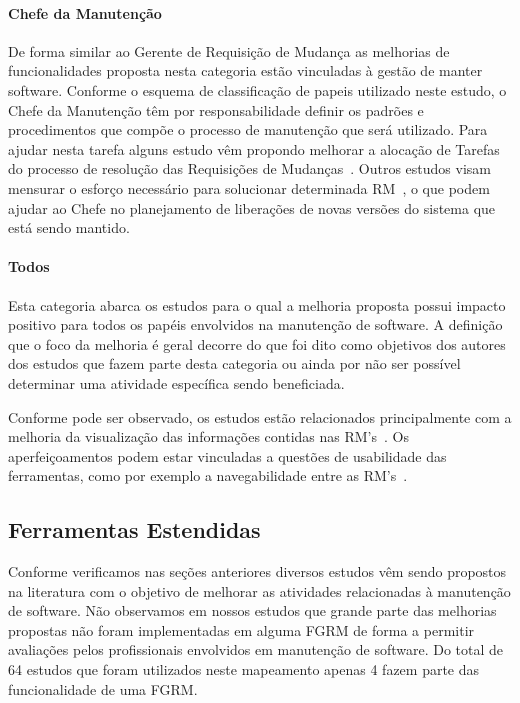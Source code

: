 \paragraph{Chefe da Manutenção} De forma similar ao Gerente de Requisição de
Mudança as melhorias de funcionalidades proposta nesta categoria estão
vinculadas à gestão de manter software. Conforme o esquema de  classificação de
papeis utilizado neste estudo, o Chefe da Manutenção têm por responsabilidade
definir os padrões e procedimentos que compõe o processo de manutenção que será
utilizado. Para ajudar nesta tarefa alguns estudo  vêm propondo melhorar a
alocação de Tarefas do processo de resolução das Requisições de
Mudanças~\cite{netto2010automated}. Outros estudos visam mensurar o esforço
necessário para solucionar determinada RM~\cite{Vijayakumar2014, Nagwani2010}, o
que podem ajudar ao Chefe no planejamento de liberações de novas versões do
sistema que está sendo mantido.

\paragraph{Todos} Esta categoria abarca os estudos para o qual a melhoria
proposta possui impacto positivo para todos os papéis envolvidos na manutenção
de software. A definição que o foco da melhoria é geral decorre do que foi dito
como objetivos dos autores dos estudos que fazem parte desta categoria ou ainda
por não ser possível determinar uma atividade específica sendo beneficiada.

Conforme pode ser observado, os estudos estão relacionados principalmente com a
melhoria da  visualização das informações contidas nas RM's~\cite{hora2012bug,
	takama2013application, dal2014bug}. Os aperfeiçoamentos podem estar
vinculadas a questões de usabilidade das ferramentas, como por exemplo a
navegabilidade entre as RM's~\cite{dal2014bug}.

\subsection{Ferramentas Estendidas}
\label{sub:ferrramentas_extendidas}

Conforme verificamos nas seções anteriores diversos estudos vêm sendo propostos
na li\-te\-ra\-tu\-ra com o objetivo de melhorar as atividades relacionadas à
manutenção de software. Não observamos em nossos estudos que grande parte das
melhorias propostas não foram implementadas em alguma FGRM de forma a permitir
avaliações pelos profissionais envolvidos em manutenção de software. Do total de
64 estudos que foram utilizados neste mapeamento apenas 4 fazem parte das
funcionalidade de uma FGRM\@.

